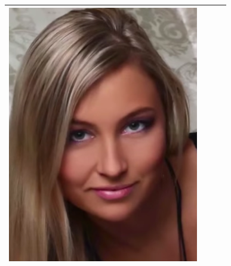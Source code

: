 \documentclass[12pt, a4paper]{article}
\begin{document}
\begin{longtable}{|c||c|c|c|}
\begin{minipage}{.29\textwidth}
    \includegraphics[width=\textwidth,height=\textheight,keepaspectratio]{images/match_body_res}
  \end{minipage} \\
    \hline
\end{longtable}
\pagebreak
\end{document}
